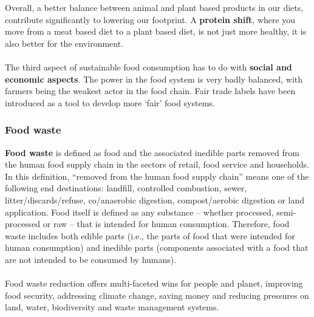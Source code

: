 \documentclass[../summary.tex]{subfiles}
\begin{document}
	Overall, a better balance between animal and plant based products in our diets, contribute significantly to lowering our footprint. A \textbf{protein shift}, where you move from a meat based diet to a plant based diet, is not just more healthy, it is also better for the environment. 
	\\\\
	The third aspect of sustainable food consumption has to do with \textbf{social and economic aspects}. The power in the food system is very badly balanced, with farmers being the weakest actor in the food chain. Fair trade labels have been introduced as a tool to develop more ‘fair’ food systems. 
	
	\subsubsection{Food waste}
	
	 \textbf{Food waste} is defined as food and the associated inedible parts removed from the human food supply chain in the sectors of retail, food service and households. In this definition, “removed from the human food supply chain” means one of the following end destinations: landfill, controlled combustion, sewer, litter/discards/refuse, co/anaerobic digestion, compost/aerobic digestion or land application. Food itself is defined as any substance – whether processed, semi-processed or raw – that is intended for human consumption. Therefore, food waste includes both edible parts (i.e., the parts of food that were intended for human consumption) and inedible parts (components associated with a food that are not intended to be consumed by humans). 
	 \\\\
	 Food waste reduction offers multi-faceted wins for people and planet, improving food security, addressing climate change, saving money and reducing pressures on land, water, biodiversity and waste management systems. 
	 
\end{document}
